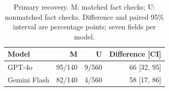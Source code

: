 \begin{table}[t]\centering\small
\caption{Primary recovery. M: matched fact checks; U: nonmatched fact checks. Difference and paired 95\% interval are percentage points; seven fields per model.}
\label{tab:primary}
\begin{tabular}{@{}lrrr@{}}\toprule
Model & M & U & Difference [CI] \\\midrule
GPT-4o & 95/140 & 9/560 & 66 [32, 95] \\
Gemini Flash & 82/140 & 4/560 & 58 [17, 86] \\
\bottomrule\end{tabular}\end{table}
